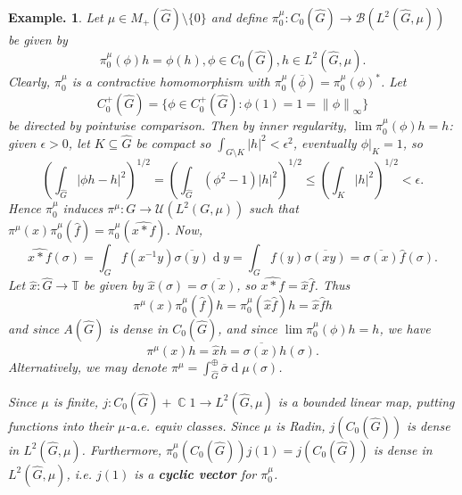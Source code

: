 \documentclass[11pt, a4paper]{memoir}
\DeclareMathOperator{\C}{{\mathbb{C}}}
\newcommand{\norm}[1]{\ensuremath{\left\lVert#1\right\rVert}}
\theoremstyle{change}
\theoremstyle{plain}
\theoremstyle{nonumberplain}
\newtheorem{example}{Example.}
\renewcommand{\d}[1]{\ensuremath{\operatorname{d}\!{#1}}}
\newcommand{\defn}[1]{{\boldmath\bfseries #1}}
\numberwithin{equation}{section}
\begin{document}
\begin{example}
    Let $\mu\in M_+(\widehat{G})\setminus\{0\}$ and define $\pi_0^\mu:C_0(\widehat{G})\to\mathcal{B}(L^2(\widehat{G},\mu))$ be given by
    \begin{equation*}
        \pi_0^\mu(\phi)h=\phi(h),\phi\in C_0(\widehat{G}),h\in L^2(\widehat{G},\mu).
    \end{equation*}
    Clearly, $\pi_0^\mu$ is a contractive homomorphism with $\pi_0^\mu(\overline{\phi})=\pi_0^\mu(\phi)^*$.
    Let
    \begin{equation*}
        C_0^+(\widehat{G}) = \{\phi\in C_0^+(\widehat{G}):\phi(1)=1=\norm{\phi}_\infty\}
    \end{equation*}
    be directed by pointwise comparison.
    Then by inner regularity, $\lim\pi_0^\mu(\phi)h=h$: given $\epsilon>0$, let $K\subseteq\widehat{G}$ be compact so $\int_{\widehat{G}\setminus K}|h|^2<\epsilon^2$, eventually $\phi|_K=1$, so
    \begin{equation*}
        \left(\int_{\widehat{G}}|\phi h-h|^2\right)^{1/2}=\left(\int_{\widehat{G}}(\phi^2-1)|h|^2\right)^{1/2}\leq\left(\int_K|h|^2\right)^{1/2}<\epsilon.
    \end{equation*}
    Hence $\pi_0^\mu$ induces $\pi^\mu:G\to\mathcal{U}(L^2(G,\mu))$ such that $\pi^\mu(x)\pi_0^\mu(\hat{f})=\pi_0^\mu(\widehat{x*f})$.
    Now,
    \begin{equation*}
        \widehat{x*f}(\sigma)=\int_Gf(x^{-1}y)\overline{\sigma(y)}\d{y}=\int_G f(y)\overline{\sigma(xy)}=\overline{\sigma(x)}\hat{f}(\sigma).
    \end{equation*}
    Let $\hat{x}:\widehat{G}\to\mathbb{T}$ be given by $\hat{x}(\sigma)=\overline{\sigma(x)}$, so $\widehat{x*f}=\hat{x}\hat{f}$.
    Thus
    \begin{equation*}
        \pi^\mu(x)\pi_0^\mu(\hat{f})h=\pi_0^\mu(\hat{x}\hat{f})h=\hat{x}\hat{f}h
    \end{equation*}
    and since $A(\widehat{G})$ is dense in $C_0(\widehat{G})$, and since $\lim\pi_0^\mu(\phi)h=h$, we have
    \begin{equation*}
        \pi^\mu(x)h=\hat{x}h=\overline{\sigma(x)}h(\sigma).
    \end{equation*}
    Alternatively, we may denote $\pi^\mu=\int_{\widehat{G}}^\oplus\overline{\sigma}\d{\mu(\sigma)}$.

    Since $\mu$ is finite, $j:C_0(\widehat{G})+\C1\to L^2(\widehat{G},\mu)$ is a bounded linear map, putting functions into their $\mu$-a.e. equiv classes.
    Since $\mu$ is Radin, $j(C_0(\widehat{G}))$ is dense in $L^2(\widehat{G},\mu)$.
    Furthermore, $\pi_0^\mu(C_0(\widehat{G}))j(1)=j(C_0(\widehat{G}))$ is dense in $L^2(\widehat{G},\mu)$, i.e. $j(1)$ is a \defn{cyclic vector} for $\pi_0^\mu$.
\end{example}
\end{document}
